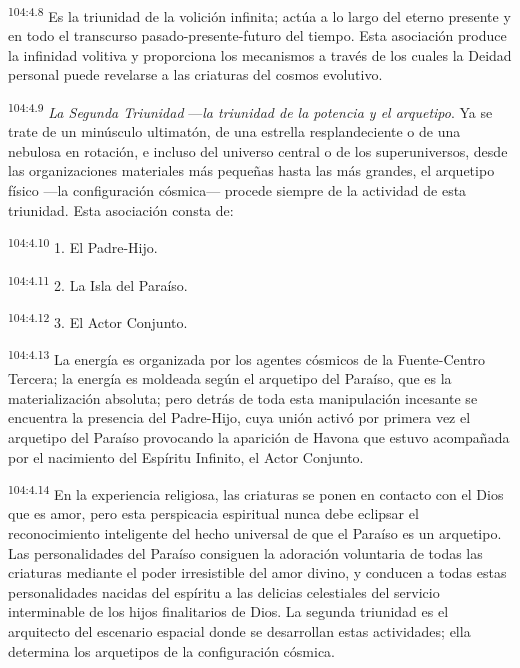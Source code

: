\par
\textsuperscript{104:4.8} Es la triunidad de la volición infinita; actúa a lo largo del eterno presente y en todo el transcurso pasado-presente-futuro del tiempo. Esta asociación produce la infinidad volitiva y proporciona los mecanismos a través de los cuales la Deidad personal puede revelarse a las criaturas del cosmos evolutivo.

\par
\textsuperscript{104:4.9} \textit{La Segunda Triunidad} ---\textit{la triunidad de la potencia y el arquetipo}. Ya se trate de un minúsculo ultimatón, de una estrella resplandeciente o de una nebulosa en rotación, e incluso del universo central o de los superuniversos, desde las organizaciones materiales más pequeñas hasta las más grandes, el arquetipo físico ---la configuración cósmica--- procede siempre de la actividad de esta triunidad. Esta asociación consta de:

\par
\textsuperscript{104:4.10} 1. El Padre-Hijo.

\par
\textsuperscript{104:4.11} 2. La Isla del Paraíso.

\par
\textsuperscript{104:4.12} 3. El Actor Conjunto.

\par
\textsuperscript{104:4.13} La energía es organizada por los agentes cósmicos de la Fuente-Centro Tercera; la energía es moldeada según el arquetipo del Paraíso, que es la materialización absoluta; pero detrás de toda esta manipulación incesante se encuentra la presencia del Padre-Hijo, cuya unión activó por primera vez el arquetipo del Paraíso provocando la aparición de Havona que estuvo acompañada por el nacimiento del Espíritu Infinito, el Actor Conjunto.

\par
\textsuperscript{104:4.14} En la experiencia religiosa, las criaturas se ponen en contacto con el Dios que es amor, pero esta perspicacia espiritual nunca debe eclipsar el reconocimiento inteligente del hecho universal de que el Paraíso es un arquetipo. Las personalidades del Paraíso consiguen la adoración voluntaria de todas las criaturas mediante el poder irresistible del amor divino, y conducen a todas estas personalidades nacidas del espíritu a las delicias celestiales del servicio interminable de los hijos finalitarios de Dios. La segunda triunidad es el arquitecto del escenario espacial donde se desarrollan estas actividades; ella determina los arquetipos de la configuración cósmica.

